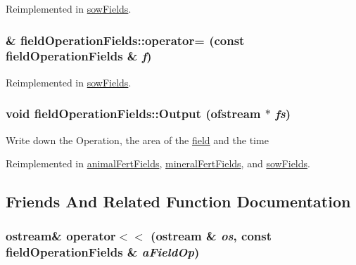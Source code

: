 Reimplemented in \hyperlink{classsow_fields_ac2784f943d1fc9ffd9f831ed792da834}{sowFields}.\hypertarget{classfield_operation_fields_aef84e67b95aeff732e28cbd2b197648a}{
\subsubsection[{operator=}]{\& fieldOperationFields::operator= (const {\bf fieldOperationFields} \& {\em f})}}
\label{classfield_operation_fields_aef84e67b95aeff732e28cbd2b197648a}


Reimplemented in \hyperlink{classsow_fields_abc76f0e726ab2388e9f9be21d6c0b8be}{sowFields}.\hypertarget{classfield_operation_fields_a8dff595b832bca540dda946639f7f47a}{
\subsubsection[{Output}]{\setlength{\rightskip}{0pt plus 5cm}void fieldOperationFields::Output (ofstream $\ast$ {\em fs})}}
\label{classfield_operation_fields_a8dff595b832bca540dda946639f7f47a}
Write down the Operation, the area of the \hyperlink{classfield}{field} and the time 

Reimplemented in \hyperlink{classanimal_fert_fields_a486ecb469147fbfd89dc4461c202ca36}{animalFertFields}, \hyperlink{classmineral_fert_fields_abbb016beaa3ec35d35a9ea0001c7b96c}{mineralFertFields}, and \hyperlink{classsow_fields_ad522bac768458cd78dfd8766545556bb}{sowFields}.

\subsection{Friends And Related Function Documentation}
\hypertarget{classfield_operation_fields_a24dfd201a1faafc49dab9678977b12e3}{
\subsubsection[{operator$<$$<$}]{\setlength{\rightskip}{0pt plus 5cm}ostream\& operator$<$$<$ (ostream \& {\em os}, \/  const {\bf fieldOperationFields} \& {\em aFieldOp})}}
\label{classfield_operation_fields_a24dfd201a1faafc49dab9678977b12e3}


